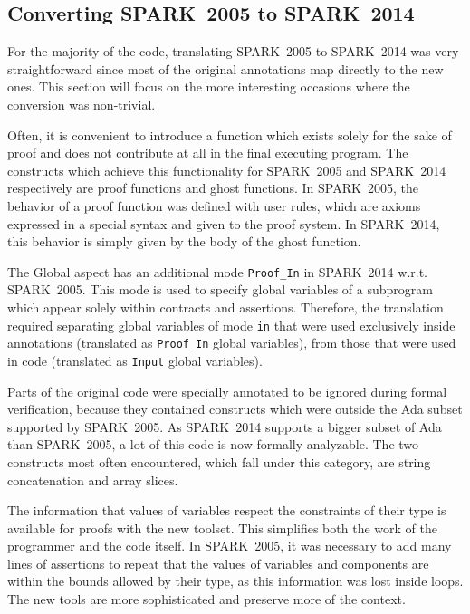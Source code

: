 \documentclass[10pt,a4paper,twocolumn]{article}
\newcommand{\oldspark}{SPARK~2005\xspace}
\newcommand{\newspark}{SPARK~2014\xspace}
\newcommand{\wrt}{w.r.t.\xspace}
\begin{document}
\subsection{Converting \oldspark to \newspark}

For the majority of the code, translating \oldspark to \newspark was
very straightforward since most of the original annotations map
directly to the new ones. This section will focus on the more
interesting occasions where the conversion was non-trivial.

Often, it is convenient to introduce a function which exists solely
for the sake of proof and does not contribute at all in the final
executing program. The constructs which achieve this functionality for
\oldspark and \newspark respectively are proof functions and ghost
functions. In \oldspark, the behavior of a proof function was defined
with user rules, which are axioms expressed in a special syntax and
given to the proof system. In \newspark, this behavior is simply given
by the body of the ghost function.

The Global aspect has an additional mode \verb|Proof_In| in \newspark
\wrt \oldspark. This mode is used to specify global variables of a
subprogram which appear solely within contracts and
assertions. Therefore, the translation required separating global
variables of mode \verb|in| that were used exclusively inside
annotations (translated as \verb|Proof_In| global variables), from
those that were used in code (translated as \verb|Input| global
variables).

Parts of the original code were specially annotated to be ignored
during formal verification, because they contained constructs which
were outside the Ada subset supported by \oldspark. As \newspark
supports a bigger subset of Ada than \oldspark, a lot of this code is
now formally analyzable. The two constructs most often encountered,
which fall under this category, are string concatenation and array
slices.

The information that values of variables respect the constraints of
their type is available for proofs with the new toolset. This
simplifies both the work of the programmer and the code itself. In
\oldspark, it was necessary to add many lines of assertions to repeat
that the values of variables and components are within the bounds
allowed by their type, as this information was lost inside loops. The
new tools are more sophisticated and preserve more of the context.

\end{document}
